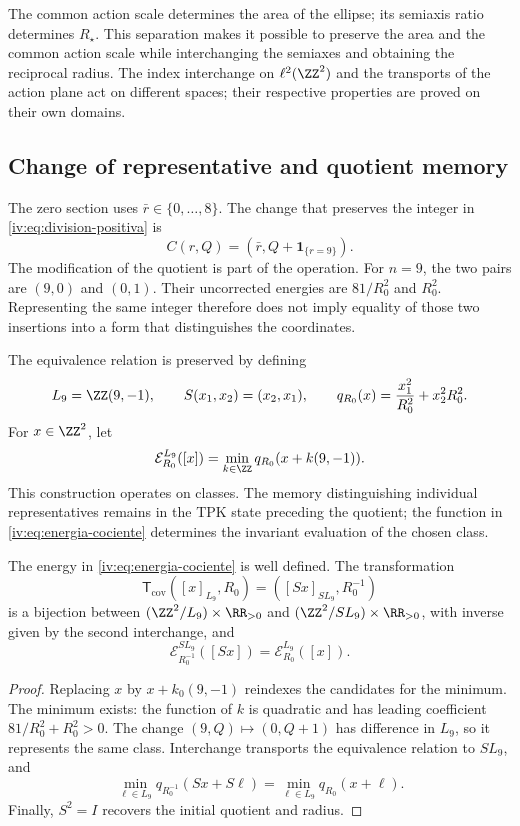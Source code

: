 The common action scale determines the area of the ellipse; its semiaxis
ratio determines \(R_\star\). This separation makes it possible to preserve
the area and the common action scale while interchanging the semiaxes and obtaining
the reciprocal radius. The index interchange on \(\ell^2(\ZZ^2)\)
and the transports of the action plane act on different spaces;
their respective properties are proved on their own domains.

\subsection{Change of representative and quotient memory}

The zero section uses \(\bar r\in\{0,\ldots,8\}\). The change
that preserves the integer in \eqref{iv:eq:division-positiva} is
\begin{equation}
 C(r,Q)=(\bar r,Q+\mathbf1_{\{r=9\}}).
 \label{iv:eq:cambio-seccion}
\end{equation}
The modification of the quotient is part of the operation.
For \(n=9\), the two pairs are \((9,0)\) and \((0,1)\).
Their uncorrected energies are \(81/R_0^2\) and \(R_0^2\).
Representing the same integer therefore does not imply equality of
those two insertions into a form that distinguishes the coordinates.

The equivalence relation is preserved by defining
\[
 L_9=\ZZ(9,-1),\qquad S(x_1,x_2)=(x_2,x_1),
 \qquad q_{R_0}(x)=\frac{x_1^2}{R_0^2}+x_2^2R_0^2.
\]
For \(x\in\ZZ^2\), let
\begin{equation}
 \mathcal E_{R_0}^{L_9}([x])
 =\min_{k\in\ZZ}q_{R_0}(x+k(9,-1)).
 \label{iv:eq:energia-cociente}
\end{equation}
This construction operates on classes. The memory distinguishing
individual representatives remains in the TPK state preceding
the quotient; the function in \eqref{iv:eq:energia-cociente}
determines the invariant evaluation of the chosen class.

\begin{theorem}
\label{iv:thm:dualidad-cociente}
The energy in \eqref{iv:eq:energia-cociente} is well defined.
The transformation
\[
 \mathsf T_{\mathrm{cov}}([x]_{L_9},R_0)
 =([Sx]_{SL_9},R_0^{-1})
\]
is a bijection between
\((\ZZ^2/L_9)\times\RR_{>0}\) and
\((\ZZ^2/SL_9)\times\RR_{>0}\), with inverse given by the
second interchange, and
\[
 \mathcal E_{R_0^{-1}}^{SL_9}([Sx])
 =\mathcal E_{R_0}^{L_9}([x]).
\]
\end{theorem}
\begin{proof}
Replacing \(x\) by \(x+k_0(9,-1)\) reindexes the candidates
for the minimum. The minimum exists: the function of \(k\) is quadratic and
has leading coefficient \(81/R_0^2+R_0^2>0\). The change
\((9,Q)\mapsto(0,Q+1)\) has difference in \(L_9\), so
it represents the same class. Interchange transports
the equivalence relation to \(SL_9\), and
\[
 \min_{\ell\in L_9}q_{R_0^{-1}}(Sx+S\ell)
 =\min_{\ell\in L_9}q_{R_0}(x+\ell).
\]
Finally, \(S^2=I\) recovers the initial quotient and radius.
\end{proof}

